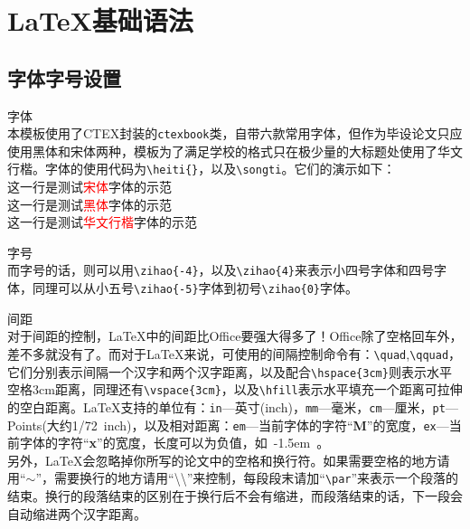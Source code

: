 \chapter{\LaTeX{}基础语法}
    \section{字体字号设置}
    \begin{description}
    \item{字体}\\
        本模板使用了CTEX封装的\texttt{ctexbook}类，自带六款常用字体，但作为毕设论文只应使用黑体和宋体两种，模板为了满足学校的格式只在极少量的大标题处使用了华文行楷。字体的使用代码为\texttt{\textbackslash heiti\{\}}，以及\texttt{\textbackslash songti}。它们的演示如下：\\
    {\songti 这一行是测试\textcolor{red}{宋体}字体的示范}\\
    {\heiti 这一行是测试\textcolor{red}{黑体}字体的示范}\\
    {\hwxingkai 这一行是测试\textcolor{red}{华文行楷}字体的示范}\\
    \item{字号}\\
    而字号的话，则可以用\texttt{\textbackslash zihao\{-4\}}，以及\texttt{\textbackslash zihao\{4\}}来表示小四号字体和四号字体，同理可以从小五号\texttt{\textbackslash zihao\{-5\}}字体到初号\texttt{\textbackslash zihao\{0\}}字体。\\
    \item{间距}\\
    对于间距的控制，\LaTeX{}中的间距比Office要强大得多了！Office除了空格回车外，差不多就没有了。而对于\LaTeX{}来说，可使用的间隔控制命令有：\texttt{\textbackslash quad},\texttt{\textbackslash qquad}，它们分别表示间隔一个汉字和两个汉字距离，以及配合\texttt{\textbackslash hspace\{3cm\}}则表示水平空格3cm距离，同理还有\texttt{\textbackslash vspace\{3cm\}}，以及\texttt{\textbackslash hfill}表示水平填充一个距离可拉伸的空白距离。\LaTeX{}支持的单位有：\texttt{in}---英寸(inch)，\texttt{mm}---毫米，\texttt{cm}---厘米，\texttt{pt}---Points(大约1\slash 72~inch)，以及相对距离：\texttt{em}---当前字体的字符“\textbf{M}”的宽度，\texttt{ex}---当前字体的字符“\textbf{x}”的宽度，长度可以为负值，如~-1.5em~。\\
    另外，\LaTeX{}会忽略掉你所写的论文中的空格和换行符。如果需要空格的地方请用“$\sim$”，需要换行的地方请用“\textbackslash\textbackslash ”来控制，每段段末请加“\texttt{\textbackslash par}”来表示一个段落的结束。换行的段落结束的区别在于换行后不会有缩进，而段落结束的话，下一段会自动缩进两个汉字距离。

    \end{description}

